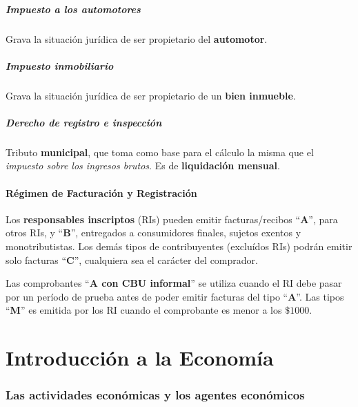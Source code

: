 \documentclass[10pt,a4paper]{article}
\begin{document}
\subsubsection{Impuesto a los automotores}

Grava la situación jurídica de ser propietario del \textbf{automotor}.

\subsubsection{Impuesto inmobiliario}

Grava la situación jurídica de ser propietario de un \textbf{bien inmueble}.

\subsubsection{Derecho de registro e inspección}

Tributo \textbf{municipal}, que toma como base para el cálculo la misma que el \textit{impuesto sobre los ingresos brutos}. Es de \textbf{liquidación mensual}.

\subsection{Régimen de Facturación y Registración}

Los \textbf{responsables inscriptos} (RIs) pueden emitir facturas/recibos ``\textbf{A}'', para otros RIs, y ``\textbf{B}'', entregados a consumidores finales, sujetos exentos y monotributistas. Los demás tipos de contribuyentes (excluídos RIs) podrán emitir solo facturas ``\textbf{C}'', cualquiera sea el carácter del comprador.

Las comprobantes ``\textbf{A con CBU informal}'' se utiliza cuando el RI debe pasar por un período de prueba antes de poder emitir facturas del tipo ``\textbf{A}''. Las tipos ``\textbf{M}'' es emitida por los RI cuando el comprobante es menor a los $\$1000$.

\newpage
\part{Introducción a la Economía}
\setcounter{section}{0}

\section{Las actividades económicas y los agentes económicos}
\end{document}
